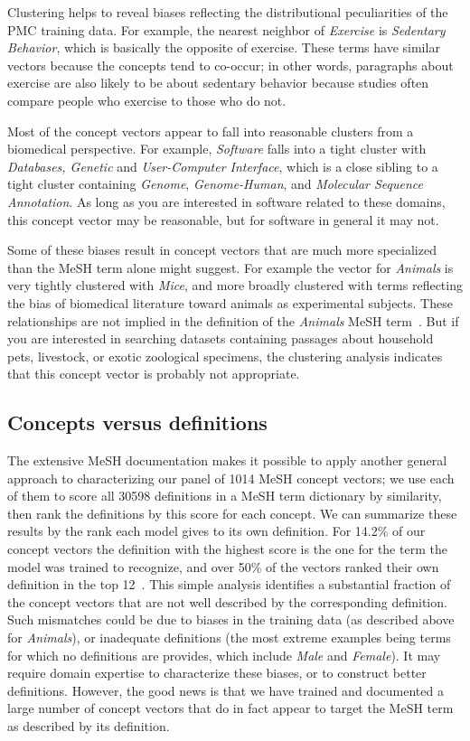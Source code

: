 \documentclass[letterpaper]{article} %
\begin{document}
Clustering helps to reveal biases reflecting the distributional peculiarities of the PMC training data.
For example, the nearest neighbor of \textit{Exercise} is \textit{Sedentary Behavior}, which is basically the opposite of exercise. These terms have similar vectors because the concepts tend to co-occur; in other words, paragraphs about exercise are also likely to be about sedentary behavior because studies often compare people who exercise to those who do not.

Most of the concept vectors appear to fall into reasonable clusters from a biomedical perspective. For example, \textit{Software} falls into a tight cluster with \textit{Databases, Genetic} and \textit{User-Computer Interface}, which is a close sibling to a tight cluster containing \textit{Genome}, \textit{Genome-Human}, and \textit{Molecular Sequence Annotation}. As long as you are interested in software related to these domains, this concept vector may be reasonable, but for software in general it may not.

Some of these biases result in concept vectors that are much more specialized than the MeSH term alone might suggest. For example the vector for \textit{Animals} is very tightly clustered with \textit{Mice}, and more broadly clustered with terms reflecting the bias of biomedical literature toward animals as experimental subjects. These relationships are not implied in the definition of the \textit{Animals} MeSH term~\cite{meshanimals}. But if you are interested in searching datasets containing passages about household pets, livestock, or exotic zoological specimens, the clustering analysis indicates that this concept vector is probably not appropriate.

\subsection{Concepts versus definitions}

The extensive MeSH documentation makes it possible to apply another general approach to characterizing our panel of 1014 MeSH concept vectors; we use each of them to score all 30598 definitions in a MeSH term dictionary by similarity, then rank the definitions by this score for each concept. We can summarize these results by the rank each model gives to its own definition. For 14.2\% of our concept vectors the definition with the highest score is the one for the term the model was trained to recognize, and over 50\% of the vectors ranked their own definition in the top 12~\cite{definitionranks}. This simple analysis identifies a substantial fraction of the concept vectors that are not well described by the corresponding definition. Such mismatches could be due to biases in the training data (as described above for \textit{Animals}), or inadequate definitions (the most extreme examples being terms for which no definitions are provides, which include \textit{Male} and \textit{Female}). It may require domain expertise to characterize these biases, or to construct better definitions. However, the good news is that we have trained and documented a large number of concept vectors that do in fact appear to target the MeSH term as described by its definition.
\end{document}
